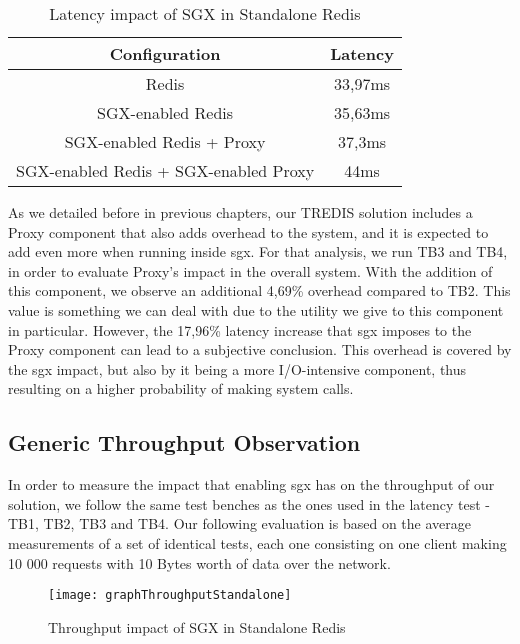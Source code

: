 \begin{table}[ht]
	\caption{Latency impact of SGX in Standalone Redis} %
	\centering %
	\begin{tabular}{c c} %
		\hline\hline %
		\textbf{Configuration} & \textbf{Latency} \\ [0.5ex] %
		\hline
		Redis & 33,97ms\\
		\hline
		SGX-enabled Redis & 35,63ms \\
		\hline
	    SGX-enabled Redis + Proxy & 37,3ms \\
		\hline %
	    SGX-enabled Redis + SGX-enabled Proxy & 44ms\\ [1ex] %
		\hline %
	\end{tabular}
	\label{table:latencySingleRedis} %
\end{table}

As we detailed before in previous chapters, our TREDIS solution includes a Proxy component that also adds overhead to the system, and it is expected to add even more when running inside \gls{sgx}. For that analysis, we run TB3 and TB4, in order to evaluate Proxy's impact in the overall system. With the addition of this component, we observe an additional 4,69\% overhead compared to TB2. This value is something we can deal with due to the utility we give to this component in particular. However, the 17,96\% latency increase that \gls{sgx} imposes to the Proxy component can lead to a subjective conclusion. This overhead is covered by the \gls{sgx} impact, but also by it being a more I/O-intensive component, thus resulting on a higher probability of making system calls.

\subsection{Generic Throughput Observation}

In order to measure the impact that enabling \gls{sgx} has on the throughput of our solution, we follow the same test benches as the ones used in the latency test - TB1, TB2, TB3 and TB4. Our following evaluation is based on the average measurements of a set of identical tests, each one consisting on one client making 10 000 requests with 10 Bytes worth of data over the network.

\begin{figure}[htbp]
	\centering
	{\texttt{[image: graphThroughputStandalone]}}
	\caption{Throughput impact of SGX in Standalone Redis}
	\label{fig:graphThroughputStandalone}
\end{figure}

